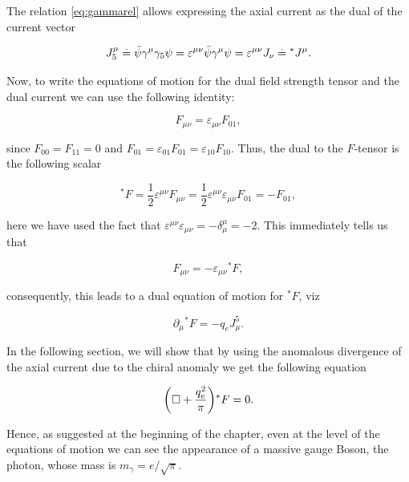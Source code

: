 The relation \eqref{eq:gammarel} allows expressing the axial current as the dual of the current vector

\begin{equation}
J_5^\mu \overset{.}{=} \bar\psi\gamma^\mu\gamma_5\psi = \varepsilon^{\mu\nu} \bar\psi\gamma^\mu\psi = \varepsilon^{\mu\nu}J_\nu \overset{.}{=}{}^\ast J^\mu.
\end{equation}

Now, to write the equations of motion for the dual field strength tensor and the dual current we can use the following identity:

\begin{equation}
F_{\mu\nu}  = \varepsilon_{\mu\nu} F_{01},
\end{equation}

since $F_{00}=F_{11}=0$ and $F_{01} = \varepsilon_{01}F_{01} = \varepsilon_{10}F_{10}$. Thus, the dual to the $F$-tensor is the following scalar

\begin{equation}
{}^\ast F = \frac{1}{2}\varepsilon^{\mu\nu} F_{\mu\nu} = \frac{1}{2}\varepsilon^{\mu\nu}\varepsilon_{\mu\nu}F_{01} = -F_{01},
\end{equation}

here we have used the fact that $\varepsilon^{\mu\nu}\varepsilon_{\mu\nu}=-\delta^\mu_\mu =-2$. This immediately tells us that

\begin{equation}
F_{\mu\nu} = - \varepsilon_{\mu\nu}{}^\ast F,
\end{equation}

consequently, this leads to a dual equation of motion for ${}^\ast F$, viz

\begin{equation}
\partial_\mu {}^\ast F = - q_eJ_\mu^5.
\label{eq:dualeom}
\end{equation}

In the following section, we will show that by using the anomalous divergence of the axial current due to the chiral anomaly we get the following equation

\begin{equation}
    \qty(\Box + \frac{q_e^2}{\pi}){}^\ast F=0.
    \label{eq:KGmass}
\end{equation}

Hence, as suggested at the beginning of the chapter, even at the level of the equations of motion we can see the appearance of a massive gauge Boson, the photon, whose mass is  $m_\gamma = e/\sqrt{\pi}.$\\

